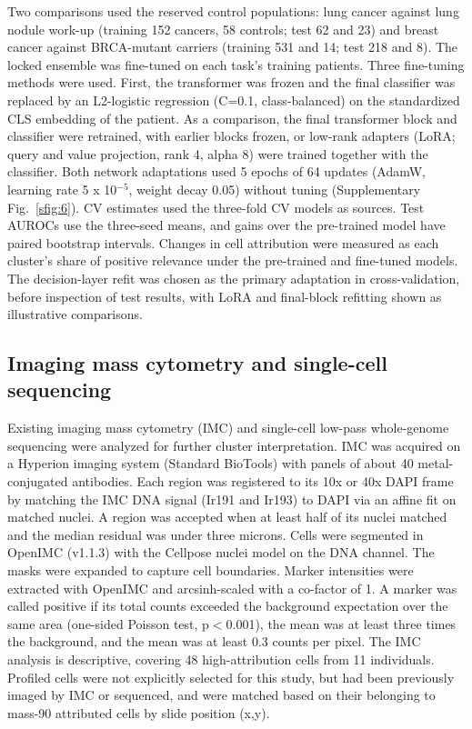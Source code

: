 \documentclass[11pt]{article}
\begin{document}
Two comparisons used the reserved control populations: lung cancer against lung nodule work-up (training 152 cancers, 58 controls; test 62 and 23) and breast cancer against BRCA-mutant carriers (training 531 and 14; test 218 and 8). The locked ensemble was fine-tuned on each task's training patients. Three fine-tuning methods were used. First, the transformer was frozen and the final classifier was replaced by an L2-logistic regression (C=0.1, class-balanced) on the standardized CLS embedding of the patient. As a comparison, the final transformer block and classifier were retrained, with earlier blocks frozen, or low-rank adapters\cite{hu2022} (LoRA; query and value projection, rank 4, alpha 8) were trained together with the classifier. Both network adaptations used 5 epochs of 64 updates (AdamW, learning rate 5 x 10$^{-5}$, weight decay 0.05) without tuning (Supplementary Fig.~\ref{sfig:6}). CV estimates used the three-fold CV models as sources. Test AUROCs use the three-seed means, and gains over the pre-trained model have paired bootstrap intervals. Changes in cell attribution were measured as each cluster's share of positive relevance under the pre-trained and fine-tuned models. The decision-layer refit was chosen as the primary adaptation in cross-validation, before inspection of test results, with LoRA and final-block refitting shown as illustrative comparisons.

\subsection*{Imaging mass cytometry and single-cell sequencing}

Existing imaging mass cytometry (IMC) and single-cell low-pass whole-genome sequencing were analyzed for further cluster interpretation. IMC was acquired on a Hyperion imaging system\cite{gerdtsson2018,giesen2014} (Standard BioTools) with panels of about 40 metal-conjugated antibodies. Each region was registered to its 10x or 40x DAPI frame by matching the IMC DNA signal (Ir191 and Ir193) to DAPI via an affine fit on matched nuclei. A region was accepted when at least half of its nuclei matched and the median residual was under three microns. Cells were segmented in OpenIMC (v1.1.3)\cite{tessone2025openimc} with the Cellpose nuclei model\cite{stringer2021} on the DNA channel. The masks were expanded to capture cell boundaries. Marker intensities were extracted with OpenIMC and arcsinh-scaled with a co-factor of 1. A marker was called positive if its total counts exceeded the background expectation over the same area (one-sided Poisson test, p$<$0.001), the mean was at least three times the background, and the mean was at least 0.3 counts per pixel. The IMC analysis is descriptive, covering 48 high-attribution cells from 11 individuals. Profiled cells were not explicitly selected for this study, but had been previously imaged by IMC or sequenced, and were matched based on their belonging to mass-90 attributed cells by slide position (x,y).
\end{document}
